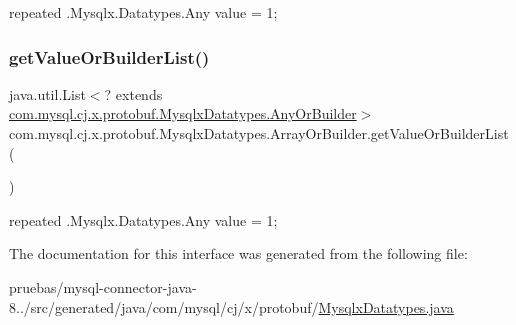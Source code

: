 {\ttfamily repeated .Mysqlx.\+Datatypes.\+Any value = 1;} \mbox{\label{interfacecom_1_1mysql_1_1cj_1_1x_1_1protobuf_1_1_mysqlx_datatypes_1_1_array_or_builder_a1a2e144dc119a975787cbf8d10b5d8a2}} 
\subsubsection{\texorpdfstring{get\+Value\+Or\+Builder\+List()}{getValueOrBuilderList()}}
{\footnotesize\ttfamily java.\+util.\+List$<$? extends \mbox{\hyperlink{interfacecom_1_1mysql_1_1cj_1_1x_1_1protobuf_1_1_mysqlx_datatypes_1_1_any_or_builder}{com.\+mysql.\+cj.\+x.\+protobuf.\+Mysqlx\+Datatypes.\+Any\+Or\+Builder}}$>$ com.\+mysql.\+cj.\+x.\+protobuf.\+Mysqlx\+Datatypes.\+Array\+Or\+Builder.\+get\+Value\+Or\+Builder\+List (\begin{DoxyParamCaption}{ }\end{DoxyParamCaption})}

{\ttfamily repeated .Mysqlx.\+Datatypes.\+Any value = 1;} 

The documentation for this interface was generated from the following file\+:\begin{DoxyCompactItemize}
\item 
pruebas/mysql-\/connector-\/java-\/8../src/generated/java/com/mysql/cj/x/protobuf/\mbox{\hyperlink{_mysqlx_datatypes_8java}{Mysqlx\+Datatypes.\+java}}\end{DoxyCompactItemize}
